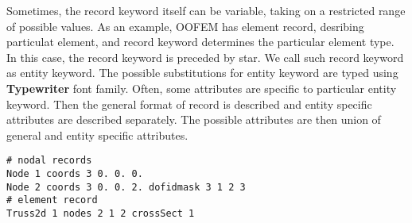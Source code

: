 \documentclass[a4paper]{report}
\newcommand{\entKeywordInst}[1]{\textbf{#1}} %
\begin{document}
Sometimes, the record keyword itself can be variable, taking on a restricted range of possible values.
As an example, OOFEM has element record, desribing particulat element, and record keyword determines the  particular element type.
In this case, the record keyword is preceded by star. We call such record keyword as entity keyword. The possible
substitutions for entity keyword are typed using \entKeywordInst{Typewriter} font family.
Often, some attributes are specific to particular entity keyword. Then the general format of record is described and entity specific attributes are described separately. The possible attributes are then union of general and entity specific attributes.

\begin{lstlisting}[style=oofem, language=oofeminput, caption={Example of input records}]
# nodal records
Node 1 coords 3 0. 0. 0.
Node 2 coords 3 0. 0. 2. dofidmask 3 1 2 3
# element record
Truss2d 1 nodes 2 1 2 crossSect 1
\end{lstlisting}
\end{document}
